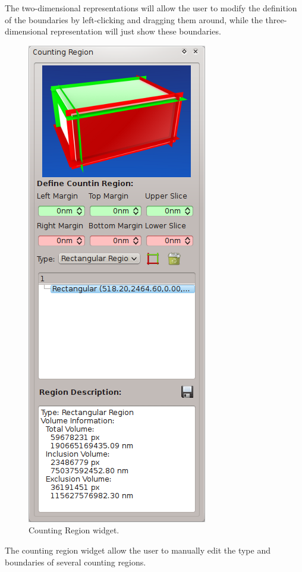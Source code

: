 The two-dimensional representations will allow the user to modify the definition of the
boundaries by left-clicking and dragging them around, while the three-dimensional
representation will just show these boundaries.\\

\begin{figure}[H]
\centering
\includegraphics[scale=0.5]{fig/plugin-ct-widget.png}
\caption{Counting Region widget.}
\end{figure}

The counting region widget allow the user to manually edit the type and boundaries of several
counting regions.\\

